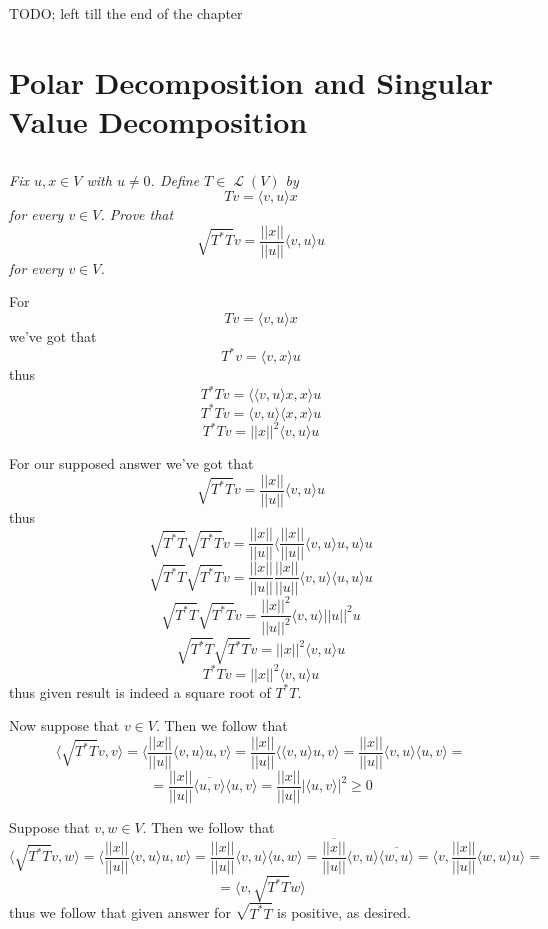 \documentclass[11pt,oneside,titlepage]{book}
\DeclareMathOperator \map {\mathcal {L}}
\newcommand{\eangle}[1]{\langle #1 \rangle}
\begin{document}
TODO; left till the end of the chapter

\section{Polar Decomposition and Singular Value Decomposition}

\subsection{}

\textit{Fix $u, x \in V$ with $u \neq 0$. Define $T \in \map(V)$ by
  $$Tv = \eangle{v, u} x$$
  for every $v \in V$. Prove that
  $$\sqrt{T^* T} v = \frac{||x||}{||u||} \eangle{v, u} u$$
  for every $v \in V$.
}

For
$$Tv = \eangle{v, u} x$$
we've got that
$$T^* v = \eangle{v, x} u$$
thus
$$T^* T v = \eangle{\eangle{v, u} x, x} u $$
$$T^* T v = \eangle{v, u} \eangle{ x, x} u $$
$$T^* T v = ||x||^2 \eangle{v, u} u $$

For our supposed answer we've got that 
$$\sqrt{T^* T} v = \frac{||x||}{||u||} \eangle{v, u} u$$
thus
$$\sqrt{T^* T}\sqrt{T^* T} v =
\frac{||x||}{||u||} \eangle{\frac{||x||}{||u||} \eangle{v, u} u, u} u$$
$$\sqrt{T^* T}\sqrt{T^* T} v =
\frac{||x||}{||u||} \frac{||x||}{||u||} \eangle{v, u}  \eangle{u, u} u$$
$$\sqrt{T^* T}\sqrt{T^* T} v =
\frac{||x||^2}{||u||^2} \eangle{v, u}  ||u||^2 u$$
$$\sqrt{T^* T}\sqrt{T^* T} v = ||x||^2 \eangle{v, u} u$$
$$T^* T  v = ||x||^2 \eangle{v, u} u$$
thus given result is indeed a square root of $T^* T$. 

Now suppose that $v \in V$. Then we follow that
$$\eangle{\sqrt{T^* T} v, v} = \eangle{\frac{||x||}{||u||} \eangle{v, u} u, v} =
\frac{||x||}{||u||} \eangle{\eangle{v, u} u, v} =
\frac{||x||}{||u||} \eangle{v, u} \eangle{ u, v} =
$$
$$ = 
\frac{||x||}{||u||} \overline{\eangle{u, v}} \eangle{ u, v} =
\frac{||x||}{||u||} |\eangle{ u, v}|^2 \geq 0$$

Suppose that $v, w \in V$. Then we follow that 
$$\eangle{\sqrt{T^* T} v, w} = \eangle{\frac{||x||}{||u||} \eangle{v, u} u, w} =
\frac{||x||}{||u||} \eangle{v, u} \eangle{u, w} =
\overline{\frac{||x||}{||u||}} \eangle{v, u} \overline{\eangle{w, u}} =
\eangle{v, \frac{||x||}{||u||} \eangle{w, u} u} =
$$
$$  = 
\eangle{v, \sqrt{T^* T} w}$$
thus we follow that given answer for $\sqrt{T^* T}$ is positive, as desired.

\subsection{}
\end{document}
